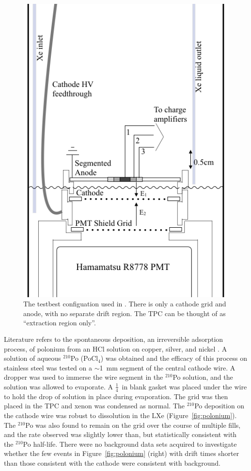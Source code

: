 \begin{figure}[htbp]
\begin{center}
\includegraphics[width=\halffig]{figures/testbed/internals1.png}
\caption{The testbest configuation used in \cite{SorensenKamdin2018}. There is only a cathode grid and anode, with no separate drift region. The \ac{TPC} can be thought of as ``extraction region only''.}
\label{fig:extraction_tpc}
\end{center}
\end{figure}


Literature refers to the spontaneous deposition, an irreversible adsorption process, of polonium from an HCl solution on copper, silver, and nickel \cite{Hashimoto1990} \cite{Figgins1961}. A solution of aqueous $^{210}$Po (PoCl$_{4}$) was obtained and the efficacy of this process on stainless steel was tested on a $\sim$1~mm segment of the central cathode wire. A dropper was used to immerse the wire segment in the $^{210}$Po solution, and the solution was allowed to evaporate. A $\frac{1}{4}$~in blank gasket was placed under the wire to hold the drop of solution in place during evaporation. The grid was then placed in the \ac{TPC} and xenon was condensed as normal. The $^{210}$Po deposition on the cathode wire was robust to dissolution in the \ac{LXe} (Figure~\ref{fig:polonium}). The $^{210}$Po was also found to remain on the grid over the course of multiple fills, and the rate observed was slightly lower than, but statistically consistent with the $^{210}$Po half-life. There were no background data sets acquired to investigate whether the few events in Figure~\ref{fig:polonium} (right) with drift times shorter than those consistent with the cathode were consistent with background. 

